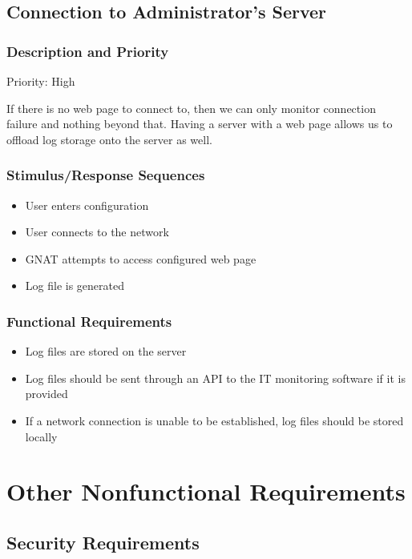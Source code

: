 \documentclass{scrreprt}
\begin{document}
\section{Connection to Administrator's Server}

\subsection{Description and Priority}

Priority: High

If there is no web page to connect to, then we can only monitor connection failure and nothing beyond that. Having a server with a web page allows us to offload log storage onto the server as well.

\subsection{Stimulus/Response Sequences}

\begin{itemize}
  \item User enters configuration
  \item User connects to the network
  \item GNAT attempts to access configured web page
  \item Log file is generated
\end{itemize}

\subsection{Functional Requirements}

\begin{itemize}
  \item Log files are stored on the server
  \item Log files should be sent through an API to the IT monitoring software if it is provided
  \item If a network connection is unable to be established, log files should be stored locally
\end{itemize}



\chapter{Other Nonfunctional Requirements}

\section{Security Requirements}
\end{document}
